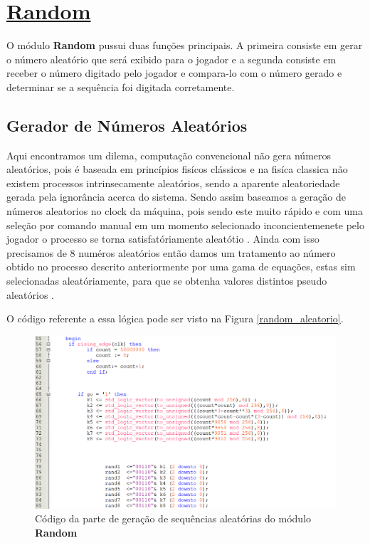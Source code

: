\documentclass[14pt, oneside]{book}
\newcommand\tab[1][1cm]{\hspace*{#1}}
\theoremstyle{definition}
\begin{document}
            \section[Random]{\hyperlink{toc}{Random}}
                \tab O módulo \textbf{Random} pussui duas funções principais. A primeira consiste em gerar o número aleatório que será exibido para o jogador e a segunda consiste em receber o número digitado pelo jogador e compara-lo com o número gerado e determinar se a sequência foi digitada corretamente.
                
                \subsection{Gerador de Números Aleatórios}
                    \tab Aqui encontramos um dilema, computação convencional não gera números aleatórios, pois é baseada em princípios fisícos clássicos e na fisíca classica não existem processos intrinsecamente aleatórios, sendo a aparente aleatoriedade gerada pela ignorância acerca do sistema. Sendo assim baseamos a geração de números aleatorios no clock da máquina, pois sendo este muito rápido e com uma seleção por comando manual em um momento selecionado inconcientemenete pelo jogador o processo se torna satisfatóriamente aleatótio . Ainda com isso precisamos de 8 numéros aleatórios então damos um tratamento ao número obtido no processo descrito anteriormente por uma gama de equações, estas sim selecionadas aleatóriamente, para que se obtenha valores distintos pseudo aleatórios .
                    
                    \tab O código referente a essa lógica pode ser visto na Figura \ref{random_aleatorio}.
                    
                        \begin{figure}[H]
                         \centering                    \includegraphics[scale=0.6]{random_aleatorio.png}
                         \caption{Código da parte de geração de sequências aleatórias do módulo \textbf{Random}}
                         \label{random_comparador}
                        \end{figure} \\
                        
\end{document}

